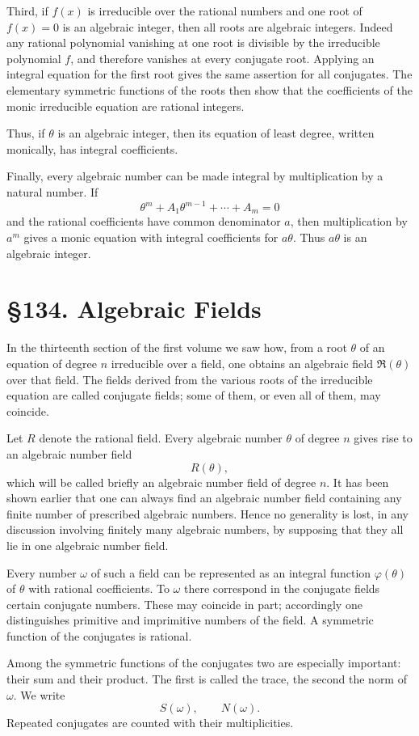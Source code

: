 \documentclass[11pt,a4paper]{book}
\newcommand{\webersection}[2]{\clearpage\section*{\S #1. #2}}
\newcommand{\R}{\mathfrak R}
\begin{document}
Third, if \(f(x)\) is irreducible over the rational numbers and one root of \(f(x)=0\) is an algebraic integer, then all roots are algebraic integers.  Indeed any rational polynomial vanishing at one root is divisible by the irreducible polynomial \(f\), and therefore vanishes at every conjugate root.  Applying an integral equation for the first root gives the same assertion for all conjugates.  The elementary symmetric functions of the roots then show that the coefficients of the monic irreducible equation are rational integers.

Thus, if \(\theta\) is an algebraic integer, then its equation of least degree, written monically, has integral coefficients.

Finally, every algebraic number can be made integral by multiplication by a natural number.  If
\[
 \theta^m+A_1\theta^{m-1}+\cdots+A_m=0
\]
and the rational coefficients have common denominator \(a\), then multiplication by \(a^m\) gives a monic equation with integral coefficients for \(a\theta\).  Thus \(a\theta\) is an algebraic integer.

\webersection{134}{Algebraic Fields}

In the thirteenth section of the first volume we saw how, from a root \(\theta\) of an equation of degree \(n\) irreducible over a field, one obtains an algebraic field \(\R(\theta)\) over that field.  The fields derived from the various roots of the irreducible equation are called conjugate fields; some of them, or even all of them, may coincide.

Let \(R\) denote the rational field.  Every algebraic number \(\theta\) of degree \(n\) gives rise to an algebraic number field
\[
 R(\theta),
\]
which will be called briefly an algebraic number field of degree \(n\).  It has been shown earlier that one can always find an algebraic number field containing any finite number of prescribed algebraic numbers.  Hence no generality is lost, in any discussion involving finitely many algebraic numbers, by supposing that they all lie in one algebraic number field.

Every number \(\omega\) of such a field can be represented as an integral function \(\varphi(\theta)\) of \(\theta\) with rational coefficients.  To \(\omega\) there correspond in the conjugate fields certain conjugate numbers.  These may coincide in part; accordingly one distinguishes primitive and imprimitive numbers of the field.  A symmetric function of the conjugates is rational.

Among the symmetric functions of the conjugates two are especially important: their sum and their product.  The first is called the trace, the second the norm of \(\omega\).  We write
\[
 S(\omega),
\qquad N(\omega).
\]
Repeated conjugates are counted with their multiplicities.
\end{document}
